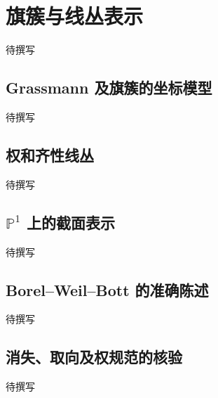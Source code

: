 
% 
% 

\section{旗簇与线丛表示}
\label{g5:sec:3602}

待撰写

\subsection{Grassmann 及旗簇的坐标模型}
\label{g5:subsec:3602:01}
待撰写

\subsection{权和齐性线丛}
\label{g5:subsec:3602:02}
待撰写

\subsection{\texorpdfstring{\(\mathbb P^1\) 上的截面表示}{P¹ 上的截面表示}}
\label{g5:subsec:3602:03}
待撰写

\subsection{Borel–Weil–Bott 的准确陈述}
\label{g5:subsec:3602:04}
待撰写

\subsection{消失、取向及权规范的核验}
\label{g5:subsec:3602:05}
待撰写
